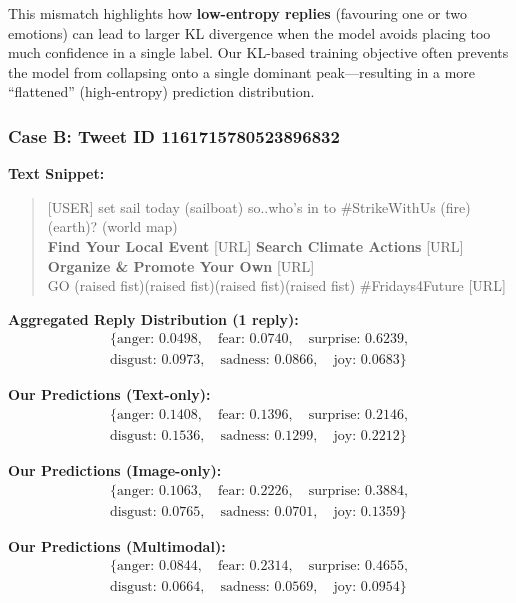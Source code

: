This mismatch highlights how \textbf{low-entropy replies} (favouring one or two emotions) can lead to larger KL divergence when the model avoids placing too much confidence in a single label. Our KL-based training objective often prevents the model from collapsing onto a single dominant peak—resulting in a more ``flattened” (high-entropy) prediction distribution.

\subsubsection*{Case B: Tweet ID 1161715780523896832}

\noindent\textbf{Text Snippet:}
\begin{quote}
[USER] set sail today (sailboat) so..who’s in to \#StrikeWithUs (fire)(earth)? (world map) \\
\textbf{Find Your Local Event} [URL] \quad
\textbf{Search Climate Actions} [URL] \quad
\textbf{Organize \& Promote Your Own} [URL] \\
GO (raised fist)(raised fist)(raised fist)(raised fist) \#Fridays4Future [URL]
\end{quote}

\noindent\textbf{Aggregated Reply Distribution (1 reply):}
\[
\begin{aligned}
\{\text{anger: } 0.0498, \quad \text{fear: } 0.0740, \quad \text{surprise: } 0.6239, \\
\text{disgust: } 0.0973, \quad \text{sadness: } 0.0866, \quad \text{joy: } 0.0683\}
\end{aligned}
\]

\noindent\textbf{Our Predictions (Text-only):}
\[
\begin{aligned}
\{\text{anger: } 0.1408, \quad \text{fear: } 0.1396, \quad \text{surprise: } 0.2146, \\
\text{disgust: } 0.1536, \quad \text{sadness: } 0.1299, \quad \text{joy: } 0.2212\}
\end{aligned}
\]

\noindent\textbf{Our Predictions (Image-only):}
\[
\begin{aligned}
\{\text{anger: } 0.1063, \quad \text{fear: } 0.2226, \quad \text{surprise: } 0.3884, \\
\text{disgust: } 0.0765, \quad \text{sadness: } 0.0701, \quad \text{joy: } 0.1359\}
\end{aligned}
\]

\noindent\textbf{Our Predictions (Multimodal):}
\[
\begin{aligned}
\{\text{anger: } 0.0844, \quad \text{fear: } 0.2314, \quad \text{surprise: } 0.4655, \\
\text{disgust: } 0.0664, \quad \text{sadness: } 0.0569, \quad \text{joy: } 0.0954\}
\end{aligned}
\]


